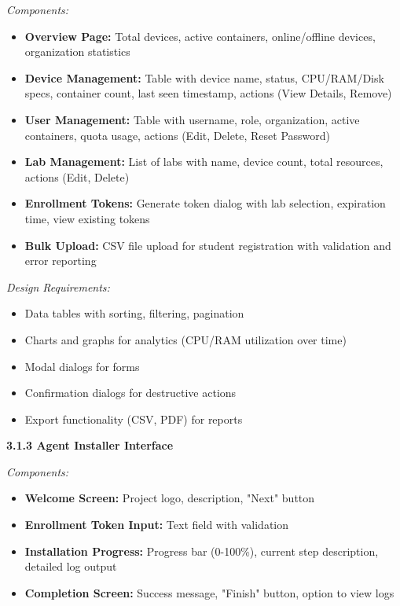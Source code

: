 \documentclass[12pt,a4paper]{article}
\begin{document}
\textit{Components:}
\begin{itemize}[noitemsep]
    \item \textbf{Overview Page:} Total devices, active containers, online/offline devices, organization statistics
    \item \textbf{Device Management:} Table with device name, status, CPU/RAM/Disk specs, container count, last seen timestamp, actions (View Details, Remove)
    \item \textbf{User Management:} Table with username, role, organization, active containers, quota usage, actions (Edit, Delete, Reset Password)
    \item \textbf{Lab Management:} List of labs with name, device count, total resources, actions (Edit, Delete)
    \item \textbf{Enrollment Tokens:} Generate token dialog with lab selection, expiration time, view existing tokens
    \item \textbf{Bulk Upload:} CSV file upload for student registration with validation and error reporting
\end{itemize}

\textit{Design Requirements:}
\begin{itemize}[noitemsep]
    \item Data tables with sorting, filtering, pagination
    \item Charts and graphs for analytics (CPU/RAM utilization over time)
    \item Modal dialogs for forms
    \item Confirmation dialogs for destructive actions
    \item Export functionality (CSV, PDF) for reports
\end{itemize}

\textbf{3.1.3 Agent Installer Interface}

\textit{Components:}
\begin{itemize}[noitemsep]
    \item \textbf{Welcome Screen:} Project logo, description, "Next" button
    \item \textbf{Enrollment Token Input:} Text field with validation
    \item \textbf{Installation Progress:} Progress bar (0-100\%), current step description, detailed log output
    \item \textbf{Completion Screen:} Success message, "Finish" button, option to view logs
\end{itemize}
\end{document}
